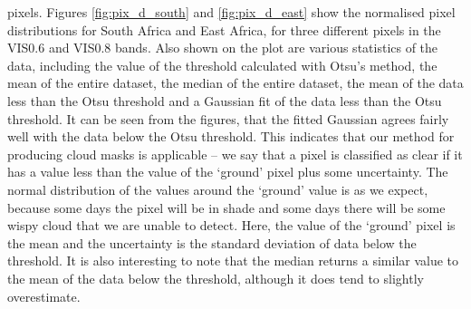 pixels. Figures \ref{fig:pix_d_south} and \ref{fig:pix_d_east} show the
normalised pixel distributions for South Africa and East Africa, for
three different pixels in the VIS0.6 and VIS0.8 bands. Also shown on
the plot are various statistics of the data, including the value of
the threshold calculated with Otsu's method, the mean of the entire
dataset, the median of the entire dataset, the mean of the data less
than the Otsu threshold and a Gaussian fit of the data less than the
Otsu threshold. It can be seen from the figures, that the fitted
Gaussian agrees fairly well with the data below the Otsu
threshold. This indicates that our method for producing cloud masks is
applicable -- we say that a pixel is classified as clear if it has a
value less than the value of the `ground' pixel plus some
uncertainty. The normal distribution of the values around the `ground'
value is as we expect, because some days the pixel will be in shade
and some days there will be some wispy cloud that we are unable to
detect. Here, the value of the `ground' pixel is the mean and the
uncertainty is the standard deviation of data below the threshold. It
is also interesting to note that the median returns a similar value to
the mean of the data below the threshold, although it does tend to
slightly overestimate.

